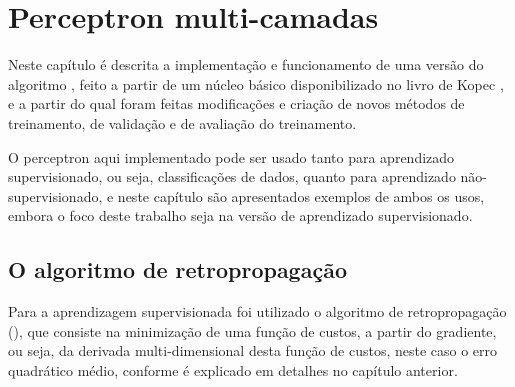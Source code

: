 
\chapter{Perceptron multi-camadas}
\label{cap:perceptron}

Neste capítulo é descrita a implementação e funcionamento de uma versão do algoritmo , feito a partir de um núcleo básico disponibilizado no livro de Kopec \citep{classic}, e a partir do qual foram feitas modificações e criação de novos métodos de treinamento, de validação e de avaliação do treinamento.

O perceptron aqui implementado pode ser usado tanto para aprendizado supervisionado, ou seja, classificações de dados, quanto para aprendizado não-supervisionado, e neste capítulo são apresentados exemplos de ambos os usos, embora o foco deste trabalho seja na versão de aprendizado supervisionado.

\section{O algoritmo de retropropagação}

Para a aprendizagem supervisionada foi utilizado o algoritmo de retropropagação (), que consiste na minimização de uma função de custos, a partir do gradiente, ou seja, da derivada multi-dimensional desta função de custos, neste caso o erro quadrático médio, conforme é explicado em detalhes no capítulo anterior.